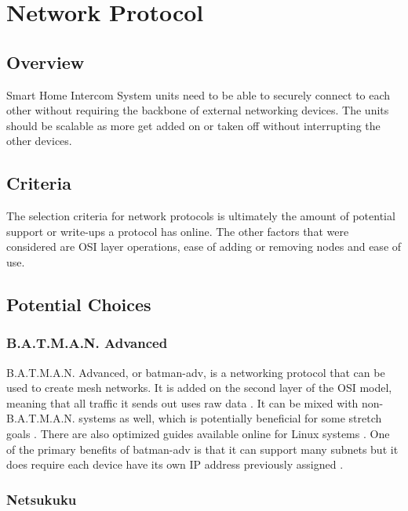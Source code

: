 \documentclass[onecolumn, draftclsnofoot,10pt, compsoc]{IEEEtran}
\begin{document}
\section{Network Protocol}

\subsection{Overview}

Smart Home Intercom System units need to be able to securely connect to each other without requiring the backbone of external networking devices. The units should be scalable as more get added on or taken off without interrupting the other devices. 

\subsection{Criteria}

The selection criteria for network protocols is ultimately the amount of potential support or write-ups a protocol has online. The other factors that were considered are OSI layer operations, ease of adding or removing nodes and ease of use.

\subsection{Potential Choices}

\subsubsection{B.A.T.M.A.N. Advanced}

B.A.T.M.A.N. Advanced, or batman-adv, is a networking protocol that can be used to create mesh networks. It is added on the second layer of the OSI model, meaning that all traffic it sends out uses raw data \cite{OpenMesh:BATMANwiki}. It can be mixed with non-B.A.T.M.A.N. systems as well, which is potentially beneficial for some stretch goals \cite{OpenMesh:BATMANquickstart}. There are also optimized guides available online for Linux systems \cite{OpenMesh:BATMANdebian}. One of the primary benefits of batman-adv is that it can support many subnets but it does require each device have its own IP address previously assigned \cite{OpenMesh:BATMANFAQ}.

\subsubsection{Netsukuku}
\end{document}

